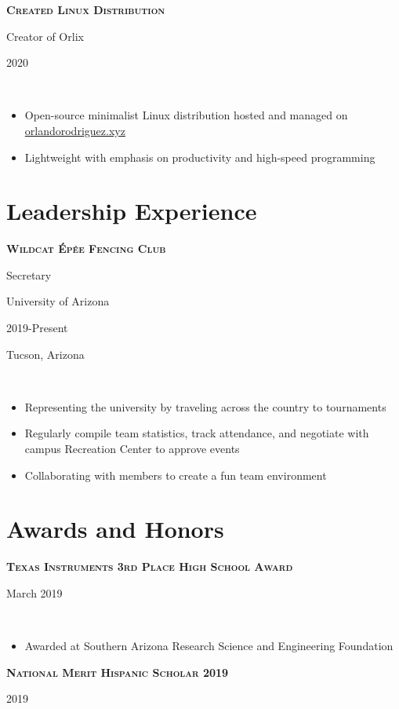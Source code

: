 \documentclass[letterpaper,10pt]{article}
\newcommand{\entry}[5]{
    \hfill\vline\hfill
    \begin{minipage}[t]{.80\textwidth}
    
        \textbf{\textsc{#3}}
        
        #4
        
        \footnotesize{#1}
    \end{minipage}
    \hfill\vline\hfill
    \begin{minipage}[t]{.15\textwidth}
        #2
        
        \footnotesize{#5}
    \end{minipage}\\\vspace{.1cm}
}
\newcommand{\ua}{University of Arizona}
\newcommand{\town}{Tucson, Arizona}
\newcommand{\site}{\href{https://www.orlandorodriguez.xyz}{orlandorodriguez.xyz}}
\begin{document}
\entry{}{2020}{Created Linux Distribution}{Creator of Orlix}{}
\begin{itemize}
    \item Open-source minimalist Linux distribution hosted and managed on \site
    \item Lightweight with emphasis on productivity and high-speed programming
\end{itemize}

\section{Leadership Experience}
\entry{\ua}{2019-Present}{Wildcat Épée Fencing Club}{Secretary}{\town}
\begin{itemize}
    \item Representing the university by traveling across the country to tournaments 
    \item Regularly compile team statistics, track attendance, and negotiate with campus Recreation Center to approve events
    \item Collaborating with members to create a fun team environment 
\end{itemize}

\section{Awards and Honors}
\entry{}{March 2019}{Texas Instruments 3rd Place High School Award}{}{}
\begin{itemize}
    \item Awarded at Southern Arizona Research Science and Engineering Foundation
\end{itemize}
\entry{}{2019}{National Merit Hispanic Scholar 2019}{}{}
\end{document}
